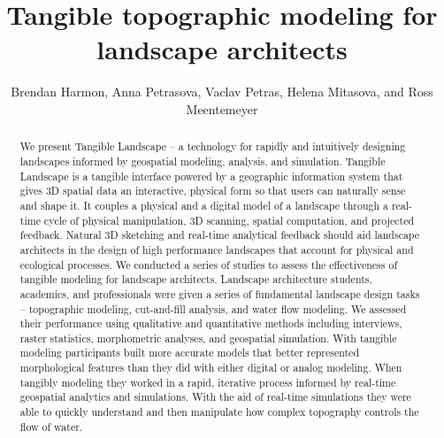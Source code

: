 \documentclass[Afour,sagev,times]{sagej} %
\begin{document}
\title{Tangible topographic modeling for landscape architects}
\author{Brendan Harmon, Anna Petrasova, Vaclav Petras, Helena Mitasova, and Ross Meentemeyer}


\begin{abstract}
We present Tangible Landscape -- a technology for rapidly and intuitively designing landscapes informed by geospatial modeling, analysis, and simulation. Tangible Landscape is a tangible interface powered by a geographic information system that gives 3D spatial data an interactive, physical form so that users can naturally sense and shape it. It couples a physical and a digital model of a landscape through a real-time cycle of physical manipulation, 3D scanning, spatial computation, and projected feedback. Natural 3D sketching and real-time analytical feedback should aid landscape architects in the design of high performance landscapes that account for physical and ecological processes. We conducted a series of studies to assess the effectiveness of tangible modeling for landscape architects. Landscape architecture students, academics, and professionals were given a series of fundamental landscape design tasks -- topographic modeling, cut-and-fill analysis, and water flow modeling. We assessed their performance using qualitative and quantitative methods including interviews, raster statistics, morphometric analyses, and geospatial simulation. With tangible modeling participants built more accurate models that better represented morphological features than they did with either digital or analog modeling. When tangibly modeling they worked in a rapid, iterative process informed by real-time geospatial analytics and simulations. With the aid of real-time simulations they were able to quickly understand and then manipulate how complex topography controls the flow of water.
\end{abstract}

\end{document}
